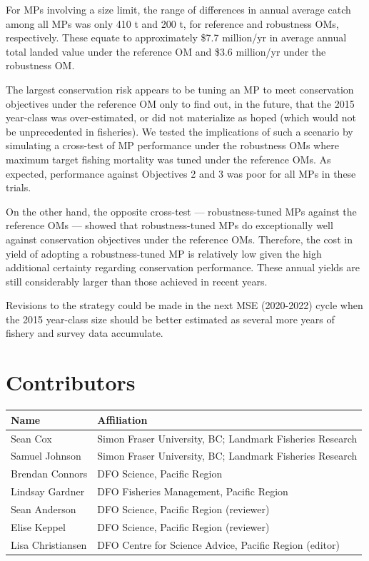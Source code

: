 \documentclass[11pt]{book}
\begin{document}
For MPs involving a size limit, the range of differences in annual average catch among all MPs was only 410 t and 200 t, for reference and robustness OMs, respectively. These equate to approximately \$7.7 million/yr in average annual total landed value under the reference OM and \$3.6 million/yr under the robustness OM.

The largest conservation risk appears to be tuning an MP to meet conservation objectives under the reference OM only to find out, in the future, that the 2015 year-class was over-estimated, or did not materialize as hoped (which would not be unprecedented in fisheries). We tested the implications of such a scenario by simulating a cross-test of MP performance under the robustness OMs where maximum target fishing mortality was tuned under the reference OMs. As expected, performance against Objectives 2 and 3 was poor for all MPs in these trials.

On the other hand, the opposite cross-test --- robustness-tuned MPs against the reference OMs --- showed that robustness-tuned MPs do exceptionally well against conservation objectives under the reference OMs. Therefore, the cost in yield of adopting a robustness-tuned MP is relatively low given the high additional certainty regarding conservation performance. These annual yields are still considerably larger than those achieved in recent years.

Revisions to the strategy could be made in the next MSE (2020-2022) cycle when the 2015 year-class size should be better estimated as several more years of fishery and survey data accumulate.

\hypertarget{contributors}{%
\section{Contributors}\label{contributors}}
\begin{longtable}[]{@{}ll@{}}
\toprule
Name & Affiliation\tabularnewline
\midrule
\endhead
Sean Cox & Simon Fraser University, BC; Landmark Fisheries Research\tabularnewline
Samuel Johnson & Simon Fraser University, BC; Landmark Fisheries Research\tabularnewline
Brendan Connors & DFO Science, Pacific Region\tabularnewline
Lindsay Gardner & DFO Fisheries Management, Pacific Region\tabularnewline
Sean Anderson & DFO Science, Pacific Region (reviewer)\tabularnewline
Elise Keppel & DFO Science, Pacific Region (reviewer)\tabularnewline
Lisa Christiansen & DFO Centre for Science Advice, Pacific Region (editor)\tabularnewline
\bottomrule
\end{longtable}
\MakeApproval
\end{document}
